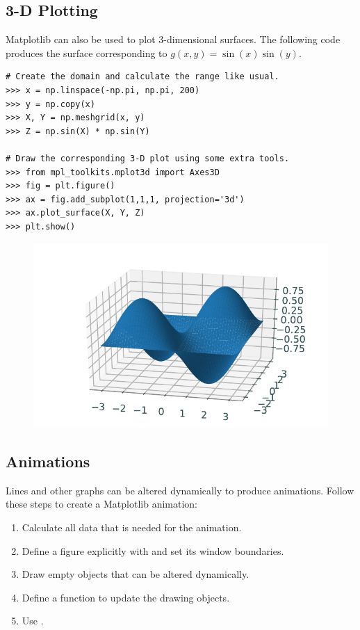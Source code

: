 \subsection*{3-D Plotting} %

Matplotlib can also be used to plot 3-dimensional surfaces.
The following code produces the surface corresponding to $g(x,y) = \sin(x)\sin(y)$.

\begin{lstlisting}
# Create the domain and calculate the range like usual.
>>> x = np.linspace(-np.pi, np.pi, 200)
>>> y = np.copy(x)
>>> X, Y = np.meshgrid(x, y)
>>> Z = np.sin(X) * np.sin(Y)

# Draw the corresponding 3-D plot using some extra tools.
>>> from mpl_toolkits.mplot3d import Axes3D
>>> fig = plt.figure()
>>> ax = fig.add_subplot(1,1,1, projection='3d')
>>> ax.plot_surface(X, Y, Z)
>>> plt.show()
\end{lstlisting}

\begin{figure}[H]
    \includegraphics[width=.7\textwidth]{figures/surface_plot.pdf}
\end{figure}

\subsection*{Animations} %

Lines and other graphs can be altered dynamically to produce animations.
Follow these steps to create a Matplotlib animation:
%
\begin{enumerate}
    \item Calculate all data that is needed for the animation.
    \item Define a figure explicitly with  and set its window boundaries.
    \item Draw empty objects that can be altered dynamically.
    \item Define a function to update the drawing objects.
    \item Use .
\end{enumerate}

